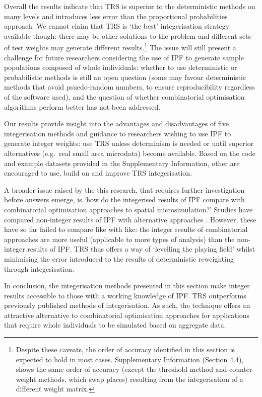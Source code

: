 Overall the results indicate that TRS is superior to the
deterministic methods on many levels and introduces less error than the
proportional probabilities approach.
We cannot claim that TRS is `the best' integerisation strategy available though:
there may be other solutions to the problem and different sets of test weights
may generate different
results.\footnote{Despite these caveats, the order of accuracy
identified in this section is expected to hold in most cases.
Supplementary Information (Section 4.4), shows the same order of
accuracy (except the threshold method and counter-weight
methods, which swap places) resulting from the integerisation of a
different weight matrix.
}
The issue will still present a
challenge for future researchers considering the use of IPF to generate sample
populations composed of whole individuals: whether to use deterministic or
probabilistic methods is still an open question (some may favour
deterministic methods that avoid psuedo-random numbers, to ensure
reproducibility regardless of the software used), and the question of whether
combinatorial optimisation algorithms perform better has not been addressed.

Our results provide insight into the advantages and disadvantages of
five integerisation methods and guidance to researchers wishing to
use IPF to generate integer weights: use
TRS unless determinism is needed or until superior alternatives (e.g.~real small
area microdata) become available. Based on the code and example datasets
provided in the Supplementary Information, other are encouraged to use, build on
and improve TRS integerisation.

A broader issue raised by the this research, that requires further
investigation before answers emerge, is `how do the integerised results of IPF
compare with combinatorial optimisation approaches to spatial microsimulation?'
Studies have compared non-integer results of IPF with
alternative approaches \citep{Smith2009, Ryan2009, Rahman2010, harland2012}.
However, these have so far failed to compare like with like: the integer results
of combinatorial approaches are more useful (applicable to more types of
analysis) than the non-integer results of IPF. TRS thus offers a
way of `levelling the playing field' whilst minimising the error introduced to
the results of deterministic reweighting through integerisation.

In conclusion, the integerisation methods presented in this section make
integer results accessible to those with a working knowledge of IPF. TRS
outperforms previously published methods of integerisation. As such, the
technique offers an attractive alternative to combinatorial
optimisation approaches for applications that
require whole individuals to be simulated based on aggregate data.

